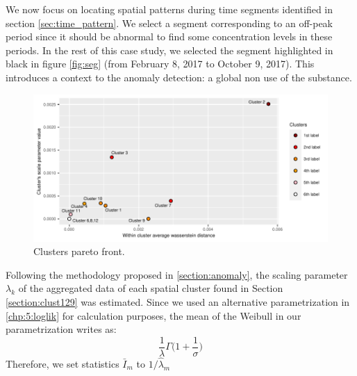 
We now focus on locating spatial patterns during time segments identified in section \ref{sec:time_pattern}. We select a segment corresponding to an off-peak period since it should be abnormal to find some concentration levels in these periods. In the rest of this case study, we selected the segment highlighted in black in figure \ref{fig:seg} (from February 8, 2017 to October 9, 2017). 
This introduces a context to the anomaly detection: a global non use of the substance. 

\begin{figure}[htbp]
  \centering
  \includegraphics[]{figs/Chap5/Pareto_plot.pdf}
  \caption{Clusters pareto front.}
  \label{fig:pareto:plot}
\end{figure}


Following the methodology proposed in \ref{section:anomaly}, the scaling parameter $\lambda_k$ of the aggregated data of each spatial cluster found in Section \ref{section:clust129} was estimated. Since we used an alternative parametrization in \eqref{chp:5:loglik} for calculation purposes, the mean of the Weibull in our parametrization writes as:
\begin{equation}
\frac{1}{\lambda}\Gamma\bigg(1+\frac{1}{\sigma}\bigg)
\end{equation}
Therefore, we set statistics $\bar{I}_m$ to $1/\hat{\lambda}_m$ 

